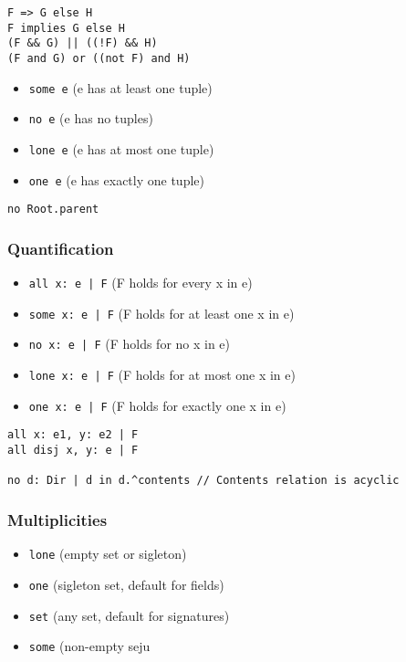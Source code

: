 \documentclass[11pt]{article}
\begin{document}
\begin{verbatim}
F => G else H
F implies G else H
(F && G) || ((!F) && H)
(F and G) or ((not F) and H)
\end{verbatim}

\begin{itemize}
\item \texttt{some e} (e has at least one tuple)
\item \texttt{no e} (e has no tuples)
\item \texttt{lone e} (e has at most one tuple)
\item \texttt{one e} (e has exactly one tuple)
\end{itemize}

\begin{verbatim}
no Root.parent
\end{verbatim}

\subsubsection{Quantification}
\label{sec:org49a858f}

\begin{itemize}
\item \texttt{all x: e | F} (F holds for every x in e)
\item \texttt{some x: e | F} (F holds for at least one x in e)
\item \texttt{no x: e | F} (F holds for no x in e)
\item \texttt{lone x: e | F} (F holds for at most one x in e)
\item \texttt{one x: e | F} (F holds for exactly one x in e)
\end{itemize}

\begin{verbatim}
all x: e1, y: e2 | F
all disj x, y: e | F

no d: Dir | d in d.^contents // Contents relation is acyclic
\end{verbatim}

\subsubsection{Multiplicities}
\label{sec:orge41ed42}

\begin{itemize}
\item \texttt{lone} (empty set or sigleton)
\item \texttt{one} (sigleton set, default for fields)
\item \texttt{set} (any set, default for signatures)
\item \texttt{some} (non-empty seju
\end{itemize}
\end{document}
